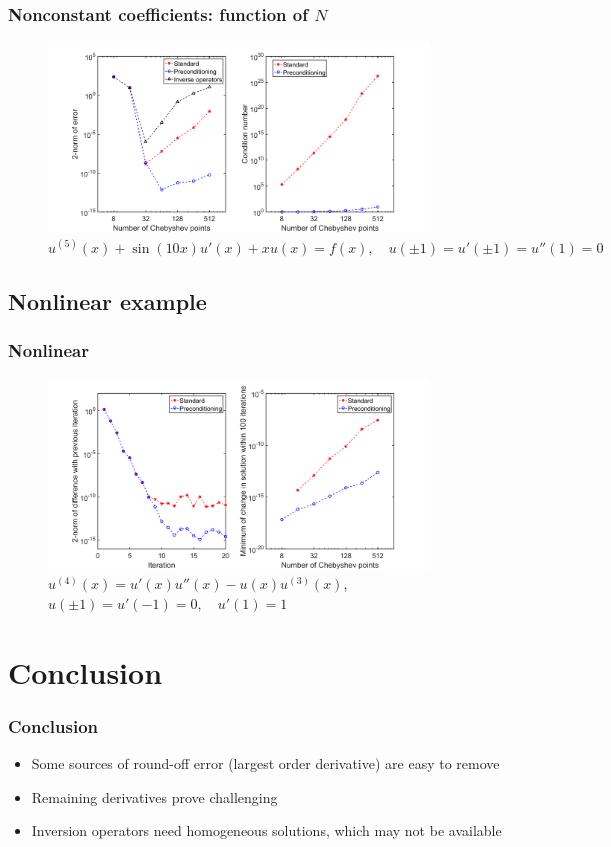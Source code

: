 \documentclass[handout]{beamer}
\begin{document}
\begin{frame}
\frametitle{Nonconstant coefficients: function of $N$}
\begin{figure}
\includegraphics[width=0.9\textwidth]{example_Wang5th_N.png}
\caption{$u^{(5)}(x) + \sin(10x) u'(x) + x u(x) = f(x), \quad u(\pm 1) = u'(\pm 1) = u''(1) = 0$}
\end{figure}
\end{frame}

\subsection{Nonlinear example}

\begin{frame}
\frametitle{Nonlinear}
\begin{figure}
\includegraphics[width=0.9\textwidth]{example_AscherNonlinear.png}
\caption{ $u^{(4)}(x) = u'(x) u''(x) - u(x) u^{(3)}(x)$, $ u(\pm 1) = u'(-1) = 0, \quad u'(1) = 1 $}
\end{figure}
\end{frame}

\section{Conclusion}

\begin{frame}
\frametitle{Conclusion}
\begin{itemize}
\item Some sources of round-off error (largest order derivative) are easy to remove
\item Remaining derivatives prove challenging
\item Inversion operators need homogeneous solutions, which may not be available
\end{itemize}
\end{frame}
\end{document}
